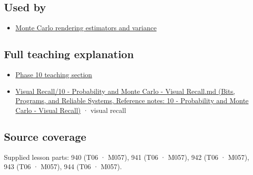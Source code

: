 \subsection{Used by}\label{appendix-8d863ed954d0-used-by}

\begin{itemize}
\tightlist
\item
  \hyperref[appendix-031e02bf28af]{Monte Carlo rendering estimators and variance}
\end{itemize}

\subsection{Full teaching explanation}\label{appendix-8d863ed954d0-full-teaching-explanation}

\begin{itemize}
\tightlist
\item
  \hyperref[02-foundations-ii-ch029-transformations-turn-simple-inputs-into-useful-samples]{Phase 10 teaching section}
\item
  \href{../01-Bits-Programs-and-Reliable-Systems/main.pdf\#nameddest=appendix-cb5af353ef77}{Visual Recall/10 - Probability and Monte Carlo - Visual Recall.md (Bits, Programs, and Reliable Systems, Reference notes: 10 - Probability and Monte Carlo - Visual Recall)} · visual recall
\end{itemize}

\subsection{Source coverage}\label{appendix-8d863ed954d0-source-coverage}

Supplied lesson parts: 940 (T06 · M057), 941 (T06 · M057), 942 (T06 · M057), 943 (T06 · M057), 944 (T06 · M057).
